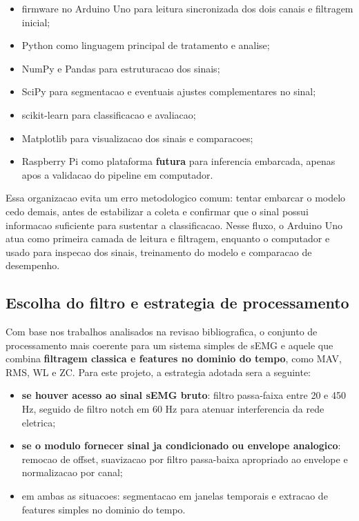 \documentclass[12pt,oneside,a4paper,brazilian]{abntex2}
\begin{document}
\begin{itemize}
  \item firmware no Arduino Uno para leitura sincronizada dos dois canais e filtragem inicial;
  \item Python como linguagem principal de tratamento e analise;
  \item NumPy e Pandas para estruturacao dos sinais;
  \item SciPy para segmentacao e eventuais ajustes complementares no sinal;
  \item scikit-learn para classificacao e avaliacao;
  \item Matplotlib para visualizacao dos sinais e comparacoes;
  \item Raspberry Pi como plataforma \textbf{futura} para inferencia embarcada, apenas apos a validacao do pipeline em computador.
\end{itemize}

Essa organizacao evita um erro metodologico comum: tentar embarcar o modelo cedo demais, antes de estabilizar a coleta e confirmar que o sinal possui informacao suficiente para sustentar a classificacao. Nesse fluxo, o Arduino Uno atua como primeira camada de leitura e filtragem, enquanto o computador e usado para inspecao dos sinais, treinamento do modelo e comparacao de desempenho.

\subsection{Escolha do filtro e estrategia de processamento}

Com base nos trabalhos analisados na revisao bibliografica, o conjunto de processamento mais coerente para um sistema simples de sEMG e aquele que combina \textbf{filtragem classica e features no dominio do tempo}, como MAV, RMS, WL e ZC. Para este projeto, a estrategia adotada sera a seguinte:

\begin{itemize}
  \item \textbf{se houver acesso ao sinal sEMG bruto}: filtro passa-faixa entre 20 e 450 Hz, seguido de filtro notch em 60 Hz para atenuar interferencia da rede eletrica;
  \item \textbf{se o modulo fornecer sinal ja condicionado ou envelope analogico}: remocao de offset, suavizacao por filtro passa-baixa apropriado ao envelope e normalizacao por canal;
  \item em ambas as situacoes: segmentacao em janelas temporais e extracao de features simples no dominio do tempo.
\end{itemize}
\end{document}
